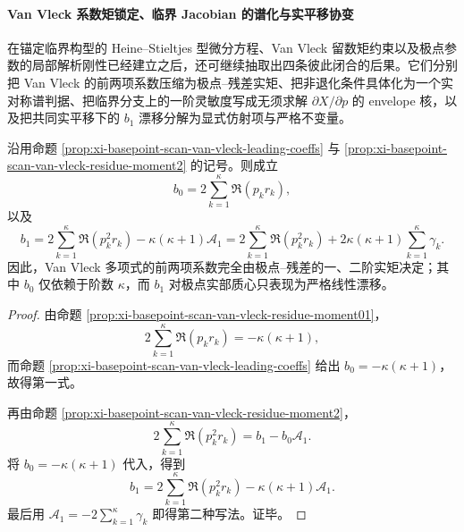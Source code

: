 \paragraph{Van Vleck 系数矩锁定、临界 Jacobian 的谱化与实平移协变}
在锚定临界构型的 Heine--Stieltjes 型微分方程、Van Vleck 留数矩约束以及极点参数的局部解析刚性已经建立之后，还可继续抽取出四条彼此闭合的后果。它们分别把 Van Vleck 的前两项系数压缩为极点--残差实矩、把非退化条件具体化为一个实对称谱判据、把临界分支上的一阶灵敏度写成无须求解 \(\partial X/\partial p\) 的 envelope 核，以及把共同实平移下的 \(b_1\) 漂移分解为显式仿射项与严格不变量。

\begin{theorem}\label{thm:xi-basepoint-scan-van-vleck-coeff-residue-bilinear-lock}
沿用命题 \ref{prop:xi-basepoint-scan-van-vleck-leading-coeffs} 与
\ref{prop:xi-basepoint-scan-van-vleck-residue-moment2} 的记号。则成立
\[
b_0=2\sum_{k=1}^{\kappa}\Re(p_k r_k),
\]
以及
\[
b_1
=
2\sum_{k=1}^{\kappa}\Re(p_k^2 r_k)-\kappa(\kappa+1)\mathcal A_1
=
2\sum_{k=1}^{\kappa}\Re(p_k^2 r_k)
+2\kappa(\kappa+1)\sum_{k=1}^{\kappa}\gamma_k.
\]
因此，Van Vleck 多项式的前两项系数完全由极点--残差的一、二阶实矩决定；其中 \(b_0\) 仅依赖于阶数 \(\kappa\)，而 \(b_1\) 对极点实部质心只表现为严格线性漂移。
\end{theorem}
\begin{proof}
由命题 \ref{prop:xi-basepoint-scan-van-vleck-residue-moment01}，
\[
2\sum_{k=1}^{\kappa}\Re(p_k r_k)=-\kappa(\kappa+1),
\]
而命题 \ref{prop:xi-basepoint-scan-van-vleck-leading-coeffs} 给出
\(
b_0=-\kappa(\kappa+1)
\)，故得第一式。

再由命题 \ref{prop:xi-basepoint-scan-van-vleck-residue-moment2}，
\[
2\sum_{k=1}^{\kappa}\Re(p_k^2 r_k)=b_1-b_0\mathcal A_1.
\]
将 \(b_0=-\kappa(\kappa+1)\) 代入，得到
\[
b_1
=
2\sum_{k=1}^{\kappa}\Re(p_k^2 r_k)-\kappa(\kappa+1)\mathcal A_1.
\]
最后用
\(
\mathcal A_1=-2\sum_{k=1}^{\kappa}\gamma_k
\)
即得第二种写法。证毕。
\end{proof}

